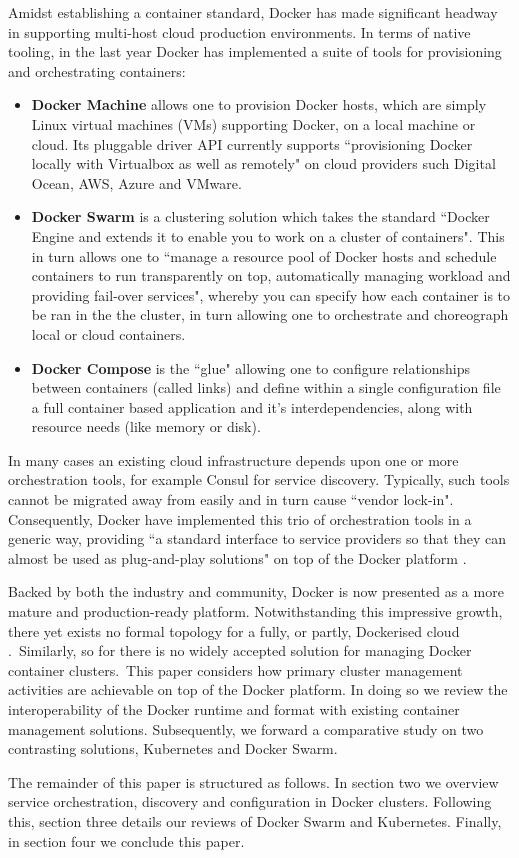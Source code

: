 \documentclass{article}
\begin{document}
\par
Amidst establishing a container standard, Docker has made significant headway in 
supporting multi-host cloud production environments. In terms of native tooling, in the last year Docker has implemented
a suite of tools for provisioning and orchestrating containers:
\begin{itemize}
\item \textbf{Docker Machine} allows one to provision Docker hosts, which are simply Linux virtual machines (VMs) supporting Docker, on a local machine or cloud. 
Its pluggable driver API currently supports ``provisioning Docker locally with Virtualbox as well as remotely" on cloud providers such Digital Ocean, AWS, Azure and VMware.
\item \textbf{Docker Swarm} is a clustering solution which takes the standard 
``Docker Engine and extends it to enable you to work on a cluster of containers". 
This in turn allows one to ``manage a resource pool of Docker hosts and schedule
containers to run transparently on top, automatically managing workload and providing fail-over services", whereby you can specify how each container is to be ran in the the cluster, in turn allowing one to orchestrate and choreograph local or cloud containers.
\item \textbf{Docker Compose} is the ``glue" allowing one to configure relationships between containers (called links) and define within a single configuration file a full container based application and it's interdependencies, along with resource needs (like memory or disk).
\end{itemize}
\noindent In many cases an existing cloud infrastructure depends upon one or more orchestration tools, for example 
Consul for service discovery. Typically, such tools cannot be migrated away from easily and in turn cause ``vendor lock-in".
Consequently, Docker have implemented this trio of orchestration tools in a generic way, 
providing ``a standard interface to service providers so that they can almost be used as plug-and-play solutions" on top of the Docker platform \citep{holla}.
\par
Backed by both the industry and community, Docker is now presented as a more mature and production-ready
platform. Notwithstanding this impressive growth, there yet exists no
formal topology for a fully, or partly, Dockerised cloud \citep{Claus}.\ Similarly,
so for there is no widely accepted solution for managing 
Docker container clusters.\
 This paper considers how primary cluster management activities are achievable on top of the Docker platform.
In doing so we review the interoperability of the Docker runtime and format with existing 
container management solutions. Subsequently, we forward a comparative study
on two contrasting solutions, Kubernetes and Docker Swarm. 
\par
The remainder of this paper is structured as follows. In
section two we overview service orchestration, discovery and configuration in Docker clusters. Following this, section three details our
reviews of Docker Swarm and Kubernetes. Finally, in section four we conclude this paper.
\end{document}
